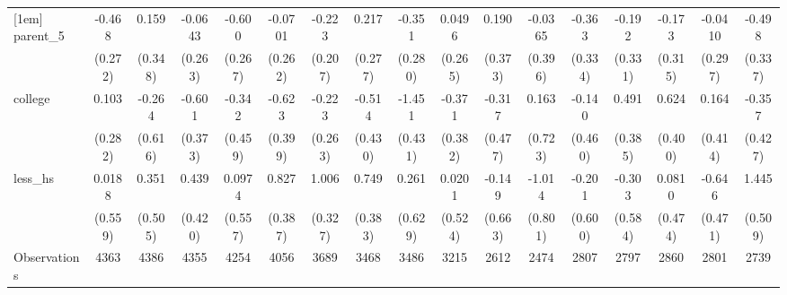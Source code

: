 {\begin{tabular}{l*{16}{c}}
[1em]
parent\_5            &      -0.468         &       0.159         &     -0.0643         &      -0.600\sym{*}  &     -0.0701         &      -0.223         &       0.217         &      -0.351         &      0.0496         &       0.190         &     -0.0365         &      -0.363         &      -0.192         &      -0.173         &     -0.0410         &      -0.498         \\
                    &     (0.272)         &     (0.348)         &     (0.263)         &     (0.267)         &     (0.262)         &     (0.207)         &     (0.277)         &     (0.280)         &     (0.265)         &     (0.373)         &     (0.396)         &     (0.334)         &     (0.331)         &     (0.315)         &     (0.297)         &     (0.337)         \\
[1em]
college             &       0.103         &      -0.264         &      -0.601         &      -0.342         &      -0.623         &      -0.223         &      -0.514         &      -1.451\sym{***}&      -0.371         &      -0.317         &       0.163         &      -0.140         &       0.491         &       0.624         &       0.164         &      -0.357         \\
                    &     (0.282)         &     (0.616)         &     (0.373)         &     (0.459)         &     (0.399)         &     (0.263)         &     (0.430)         &     (0.431)         &     (0.382)         &     (0.477)         &     (0.723)         &     (0.460)         &     (0.385)         &     (0.400)         &     (0.414)         &     (0.427)         \\
[1em]
less\_hs             &      0.0188         &       0.351         &       0.439         &      0.0974         &       0.827\sym{*}  &       1.006\sym{**} &       0.749         &       0.261         &      0.0201         &      -0.149         &      -1.014         &      -0.201         &      -0.303         &      0.0810         &      -0.646         &       1.445\sym{**} \\
                    &     (0.559)         &     (0.505)         &     (0.420)         &     (0.557)         &     (0.387)         &     (0.327)         &     (0.383)         &     (0.629)         &     (0.524)         &     (0.663)         &     (0.801)         &     (0.600)         &     (0.584)         &     (0.474)         &     (0.471)         &     (0.509)         \\
\hline
Observations        &        4363         &        4386         &        4355         &        4254         &        4056         &        3689         &        3468         &        3486         &        3215         &        2612         &        2474         &        2807         &        2797         &        2860         &        2801         &        2739         \\

\end{tabular}}
